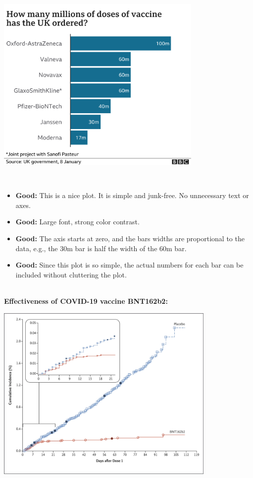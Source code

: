 \documentclass[]{book}
\providecommand{\tightlist}{%
  \setlength{\itemsep}{0pt}\setlength{\parskip}{0pt}}
\begin{document}
~\\

\includegraphics[width=0.75\textwidth,height=\textheight]{img/visc.png}

~

\begin{itemize}
\tightlist
\item
  \textbf{Good:} This is a nice plot. It is simple and junk-free. No unnecessary text or axes.
\item
  \textbf{Good:} Large font, strong color contrast.\\
\item
  \textbf{Good:} The axis starts at zero, and the bars widths are proportional to the data, e.g., the 30m bar is half the width of the 60m bar.\\
\item
  \textbf{Good:} Since this plot is so simple, the actual numbers for each bar can be included without cluttering the plot.
\end{itemize}

~\\
\textbf{Effectiveness of COVID-19 vaccine BNT162b2:}

\includegraphics[width=0.8\textwidth,height=\textheight]{img/visd.png}
\end{document}

